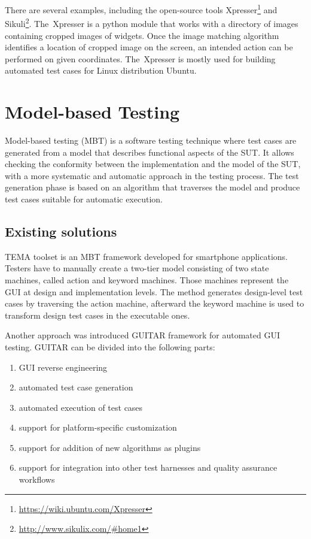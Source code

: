 There are several examples, including the open-source tools Xpresser\footnote{\url{https://wiki.ubuntu.com/Xpresser}} and Sikuli\footnote{\url{http://www.sikulix.com/\#home1}}. The~Xpresser is a python module that works with a directory of images containing cropped images of widgets. Once the image matching algorithm identifies a location of cropped image on the screen, an intended action can be performed on given coordinates.\cite{xpresser} The~Xpresser is mostly used for building automated test cases for Linux distribution Ubuntu.

\section{Model-based Testing}
Model-based testing (MBT) is a software testing technique where test cases are generated from a model that describes functional aspects of the SUT. It allows checking the conformity between the implementation and the model of the SUT, with a more systematic and automatic approach in the testing process. The test generation phase is based on an algorithm that traverses the model and produce test cases suitable for automatic execution.\cite{embedded}

\subsection{Existing solutions}
TEMA toolset is an MBT framework developed for smartphone applications. Testers have to manually create a two-tier model consisting of two state machines, called action and keyword machines. Those machines represent the GUI at design and implementation levels. The method generates design-level test cases by traversing the action machine, afterward the keyword machine is used to transform design test cases in the executable ones.\cite{TEMA}

Another approach was introduced GUITAR\cite{NguyenBao2014Gait} framework for automated GUI testing. GUITAR can be divided into the following parts:
\begin{enumerate}
    \item GUI reverse engineering
    \item automated test case generation
    \item automated execution of test cases
    \item support for platform-specific customization
    \item support for addition of new algorithms as plugins
    \item support for integration into other test harnesses and quality assurance workflows
\end{enumerate}

